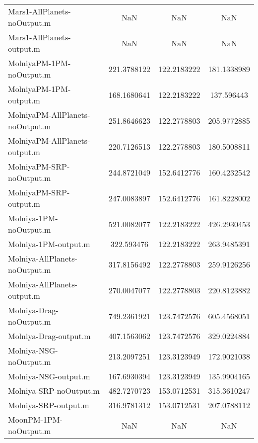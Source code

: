 \begin{table}[htbp!]
\begin{tabular}{lccc}
         Mars1-AllPlanets-noOutput.m & NaN & NaN & NaN \\
         Mars1-AllPlanets-output.m & NaN & NaN & NaN \\
         MolniyaPM-1PM-noOutput.m & 221.3788122 & 122.2183222 & 181.1338989 \\
         MolniyaPM-1PM-output.m & 168.1680641 & 122.2183222 & 137.596443 \\
         MolniyaPM-AllPlanets-noOutput.m & 251.8646623 & 122.2778803 & 205.9772885 \\
         MolniyaPM-AllPlanets-output.m & 220.7126513 & 122.2778803 & 180.5008811 \\
         MolniyaPM-SRP-noOutput.m & 244.8721049 & 152.6412776 & 160.4232542 \\
         MolniyaPM-SRP-output.m & 247.0083897 & 152.6412776 & 161.8228002 \\
         Molniya-1PM-noOutput.m & 521.0082077 & 122.2183222 & 426.2930453 \\
         Molniya-1PM-output.m & 322.593476 & 122.2183222 & 263.9485391 \\
         Molniya-AllPlanets-noOutput.m & 317.8156492 & 122.2778803 & 259.9126256 \\
         Molniya-AllPlanets-output.m & 270.0047077 & 122.2778803 & 220.8123882 \\
         Molniya-Drag-noOutput.m & 749.2361921 & 123.7472576 & 605.4568051 \\
         Molniya-Drag-output.m & 407.1563062 & 123.7472576 & 329.0224884 \\
         Molniya-NSG-noOutput.m & 213.2097251 & 123.3123949 & 172.9021038 \\
         Molniya-NSG-output.m & 167.6930394 & 123.3123949 & 135.9904165 \\
         Molniya-SRP-noOutput.m & 482.7270723 & 153.0712531 & 315.3610247 \\
         Molniya-SRP-output.m & 316.9781312 & 153.0712531 & 207.0788112 \\
         MoonPM-1PM-noOutput.m & NaN & NaN & NaN \\

\end{tabular}
\end{table}
